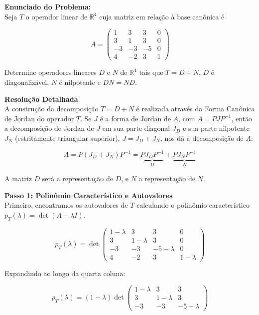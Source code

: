 \textbf{Enunciado do Problema:} \\

Seja $T$ o operador linear de $\mathbb{R}^4$ cuja matriz em relação à base canônica é

\[
A = \begin{pmatrix}
1 & 3 & 3 & 0 \\
3 & 1 & 3 & 0 \\
-3 & -3 & -5 & 0 \\
4 & -2 & 3 & 1
\end{pmatrix}
\]

Determine operadores lineares $D$ e $N$ de $\mathbb{R}^4$ tais que $T = D + N$, $D$ é diagonalizável, $N$ é nilpotente e $DN = ND$.

\bigskip

\textbf{Resolução Detalhada} \\

A construção da decomposição $T = D + N$ é realizada através da Forma Canônica de Jordan do operador $T$. Se $J$ é a forma de Jordan de $A$, com $A = PJP^{-1}$, então a decomposição de Jordan de $J$ em sua parte diagonal $J_D$ e sua parte nilpotente $J_N$ (estritamente triangular superior), $J = J_D + J_N$, nos dá a decomposição de $A$:

\[
A = P(J_D + J_N)P^{-1} = \underbrace{PJ_DP^{-1}}_{D} + \underbrace{PJ_NP^{-1}}_{N}
\]

A matriz $D$ será a representação de $D$, e $N$ a representação de $N$.

\bigskip

\textbf{Passo 1: Polinômio Característico e Autovalores} \\

Primeiro, encontramos os autovalores de $T$ calculando o polinômio característico $p_T(\lambda) = \det(A - \lambda I)$.

\[
p_T(\lambda) = \det \begin{pmatrix}
1-\lambda & 3 & 3 & 0 \\
3 & 1-\lambda & 3 & 0 \\
-3 & -3 & -5-\lambda & 0 \\
4 & -2 & 3 & 1-\lambda
\end{pmatrix}
\]

Expandindo ao longo da quarta coluna:

\[
p_T(\lambda) = (1-\lambda)\det \begin{pmatrix}
1-\lambda & 3 & 3 \\
3 & 1-\lambda & 3 \\
-3 & -3 & -5-\lambda
\end{pmatrix}
\]


